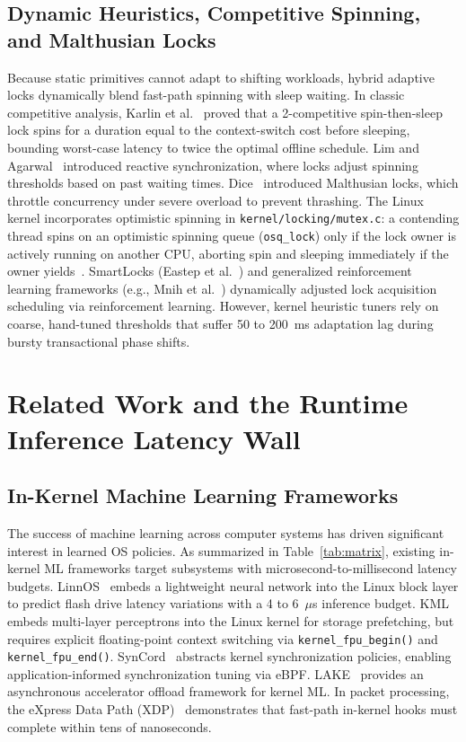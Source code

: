 \documentclass[conference]{IEEEtran}
\begin{document}
\subsection{Dynamic Heuristics, Competitive Spinning, and Malthusian Locks}
Because static primitives cannot adapt to shifting workloads, hybrid adaptive locks dynamically blend fast-path spinning with sleep waiting. In classic competitive analysis, Karlin et al.~\cite{karlin1991empirical} proved that a 2-competitive spin-then-sleep lock spins for a duration equal to the context-switch cost before sleeping, bounding worst-case latency to twice the optimal offline schedule. Lim and Agarwal~\cite{lim1994reactive} introduced reactive synchronization, where locks adjust spinning thresholds based on past waiting times. Dice~\cite{dice2017malthusian} introduced Malthusian locks, which throttle concurrency under severe overload to prevent thrashing. The Linux kernel incorporates optimistic spinning in \texttt{kernel/locking/mutex.c}: a contending thread spins on an optimistic spinning queue (\texttt{osq\_lock}) only if the lock owner is actively running on another CPU, aborting spin and sleeping immediately if the owner yields~\cite{cho2022survey}. SmartLocks (Eastep et al.~\cite{eastep2010smartlocks}) and generalized reinforcement learning frameworks (e.g., Mnih et al.~\cite{mnih2015human}) dynamically adjusted lock acquisition scheduling via reinforcement learning. However, kernel heuristic tuners rely on coarse, hand-tuned thresholds that suffer 50 to 200~ms adaptation lag during bursty transactional phase shifts.

\section{Related Work and the Runtime Inference Latency Wall}

\subsection{In-Kernel Machine Learning Frameworks}
The success of machine learning across computer systems has driven significant interest in learned OS policies. As summarized in Table~\ref{tab:matrix}, existing in-kernel ML frameworks target subsystems with microsecond-to-millisecond latency budgets. LinnOS~\cite{hao2020linnos} embeds a lightweight neural network into the Linux block layer to predict flash drive latency variations with a 4 to 6~$\mu$s inference budget. KML~\cite{agadakos2020kml} embeds multi-layer perceptrons into the Linux kernel for storage prefetching, but requires explicit floating-point context switching via \texttt{kernel\_fpu\_begin()} and \texttt{kernel\_fpu\_end()}. SynCord~\cite{park2022application} abstracts kernel synchronization policies, enabling application-informed synchronization tuning via eBPF. LAKE~\cite{fingler2023lake} provides an asynchronous accelerator offload framework for kernel ML. In packet processing, the eXpress Data Path (XDP)~\cite{hoiland2018express} demonstrates that fast-path in-kernel hooks must complete within tens of nanoseconds.
\end{document}
